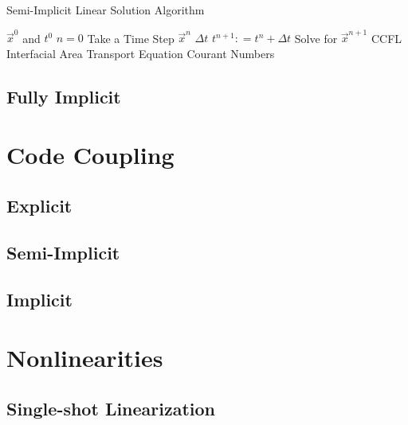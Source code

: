 \begin{algo}[H]
\caption{Semi-Implicit Linear Solution Algorithm}
\label{algo:semi_implicit}
\setlength{\baselineskip}{0.625\baselineskip}
\begin{algorithmic}[1]
\Require $\Vec{x}^{0}$ and $t^{0}$
\Set $n = 0$
\Loop \; Take a Time Step
    \Set $\vec{x}^{n}$        
    \Calculate $\Delta t$ 
    \State $t^{n+1} : = t^{n} + \Delta t$
    \BlackBox Solve for $\vec{x}^{n+1}$ 
    \Test CCFL 
    \BlackBox Interfacial Area Transport Equation
    \Calculate Courant Numbers 
\end{algorithmic}
\end{algo}

\subsection{Fully Implicit}
\label{subsect:numerics_fully_implicit}

\section{Code Coupling}
\label{sect:code_coupling}

\subsection{Explicit}
\label{subsect:coupling_explicit}

\subsection{Semi-Implicit}
\label{subsect:coupling_semi_implicit}

\subsection{Implicit}
\label{subsect:coupling_implicit}

\section{Nonlinearities}
\label{sect:nonlinearities}

\subsection{Single-shot Linearization}
\label{subsect:single_shot}

